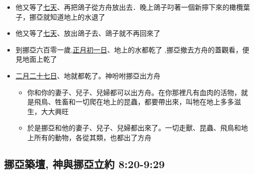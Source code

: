 \begin{itemize}
\begin{itemize}
\item 他又放出一隻鴿子去，要看看水從地上退了沒有。但遍地上都是水，鴿子找不著落腳之地，就回到方舟挪亞那裡，挪亞伸手把鴿子接進方舟來
\end{itemize}
\item 他又等了\underline{七天}、再把鴿子從方舟放出去．晚上鴿子叼著一個新擰下來的橄欖葉子，挪亞就知道地上的水退了
\item 他又等了\underline{七天}、放出鴿子去、鴿子就不再回來了 
\item 到挪亞六百零一歲,\underline{正月初一日}、地上的水都乾了 ,挪亞撤去方舟的蓋觀看，便見地面上乾了
\item \underline{二月二十七日}、地就都乾了。神吩咐挪亞出方舟 
\begin{itemize} 
\itemsep-.35em 
\item 你和你的妻子、兒子、兒婦都可以出方舟。在你那裡凡有血肉的活物，就是飛鳥、牲畜和一切爬在地上的昆蟲，都要帶出來，叫牠在地上多多滋生，大大興旺
\item 於是挪亞和他的妻子、兒子、兒婦都出來了。一切走獸、昆蟲、飛鳥和地上所有的動物，各從其類，也都出了方舟
\end{itemize} 
\end{itemize}

\subsection{挪亞築壇, 神與挪亞立約 8:20-9:29 }
